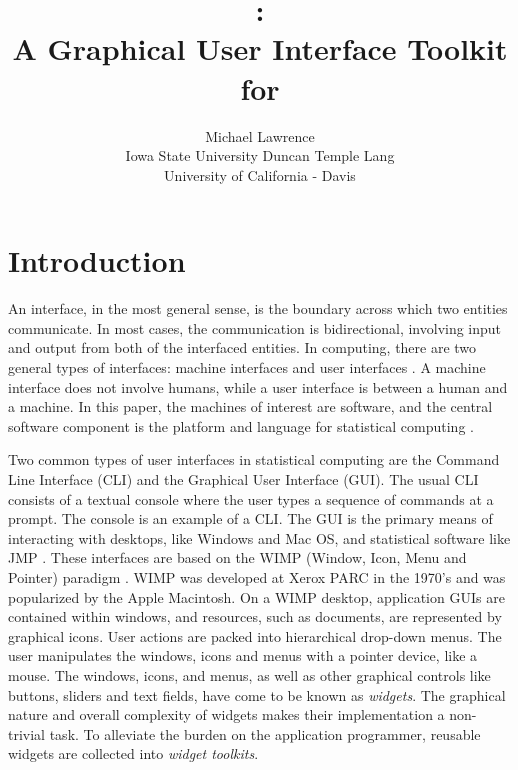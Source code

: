 \documentclass[article]{jss}
\author{Michael Lawrence\\
Iowa State University \And Duncan Temple Lang\\
University of California - Davis}
\title{\pkg{RGtk2}:\\A Graphical User Interface Toolkit for \proglang{R}}
\begin{document}
\section{Introduction}


An interface, in the most general sense, is the boundary across which two
entities communicate. In most cases, the communication is bidirectional, 
involving input and output from both of the interfaced entities. In computing,
there are two general types of interfaces: machine interfaces and user interfaces
\citep{gui-cli}. A machine interface does not involve humans, while a 
user interface is between a human and a machine. In this paper, the machines of
interest are software, and the central software component is the  
platform and language for statistical computing \citep{R}.

Two common types of user interfaces in statistical computing are the Command
Line Interface (CLI) and the Graphical User Interface (GUI). The usual CLI 
consists of a textual console where the user types a sequence of commands
at a prompt. The  console is an example of a CLI. The GUI is the primary
means of interacting with desktops, like Windows and Mac OS, and
statistical software like JMP \citep{JMP}. These
interfaces are based on the WIMP (Window, Icon, Menu and Pointer) paradigm 
\citep{WIMP}. WIMP was developed at Xerox PARC in the 1970's and was popularized by 
the Apple Macintosh. On a WIMP desktop, application GUIs are contained within 
windows, and resources, such as documents, are represented by graphical icons. 
User actions are packed into hierarchical drop-down menus. The user manipulates
the windows, icons and menus with a pointer device, like a mouse. The windows,
icons, and menus, as well as other graphical controls like buttons, sliders and 
text fields, have come to be known as \emph{widgets}. The graphical nature and 
overall complexity of widgets makes their implementation a non-trivial task. 
To alleviate the burden on the application
programmer, reusable widgets are collected into \emph{widget toolkits}.
\end{document}
